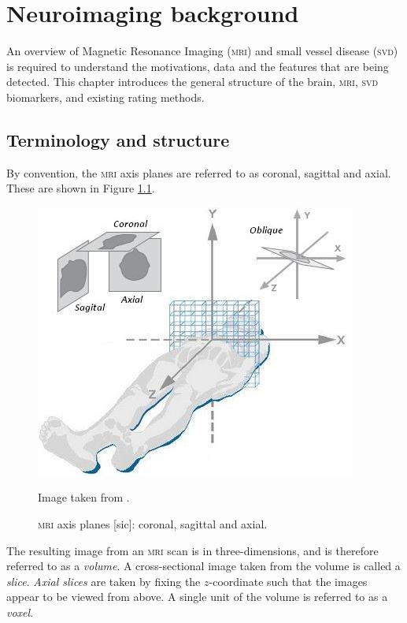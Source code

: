 %
%



\chapter{Neuroimaging background}\label{mri_svd_intro}

An overview of Magnetic Resonance Imaging (\textsc{mri}) and small vessel disease (\textsc{svd}) is required to understand the motivations, data and the features that are being detected. This chapter introduces the general structure of the brain, \textsc{mri}, \textsc{svd} biomarkers, and existing rating methods.

\section{Terminology and structure}

By convention, the \textsc{mri} axis planes are referred to as coronal, sagittal and axial. These are shown in Figure \ref{svd-axes}.

\begin{figure}[ht]
	\centering
	\includegraphics[scale=0.8]{Images/2_axes2.jpg}
	\caption{\textsc{mri} axis planes [sic]: coronal, sagittal and axial.}
	\small Image taken from \cite{Bean2014}.
	\label{svd-axes}
\end{figure}

The resulting image from an \textsc{mri} scan is in three-dimensions, and is therefore referred to as a \textit{volume}. A cross-sectional image taken from the volume is called a \textit{slice}. \textit{Axial slices} are taken by fixing the $z$-coordinate such that the images appear to be viewed from above. A single unit of the volume is referred to as a \textit{voxel}.

